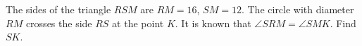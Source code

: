 The sides of the triangle $RSM$ are $RM=16$, $SM=12$. The circle with diameter $RM$ crosses the side $RS$ at the point $K$. It is known that $\angle SRM = \angle SMK$. Find $SK$. 
